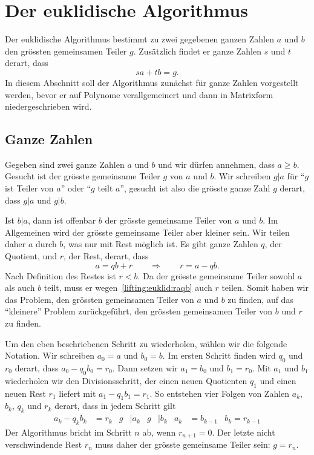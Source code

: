 %
%
%
\section{Der euklidische Algorithmus}
Der euklidische Algorithmus bestimmt zu zwei gegebenen ganzen
Zahlen $a$ und $b$ den grössten gemeinsamen Teiler $g$.
Zusätzlich findet er ganze Zahlen $s$ und $t$ derart, dass
\[
sa + tb = g.
\]
In diesem Abschnitt soll der Algorithmus zunächst für ganze Zahlen
vorgestellt werden, bevor er auf Polynome verallgemeinert und dann
in Matrixform niedergeschrieben wird.

\subsection{Ganze Zahlen}
Gegeben sind zwei ganze Zahlen $a$ und $b$ und wir dürfen annehmen,
dass $a\ge b$.
Gesucht ist der grösste gemeinsame Teiler $g$ von $a$ und $b$.
Wir schreiben $g|a$ für ``$g$ ist Teiler von $a$'' oder ``$g$ teilt $a$'',
gesucht ist also die grösste ganze Zahl $g$ derart, dass $g|a$ und $g|b$.

Ist $b|a$, dann ist offenbar $b$ der grösste gemeinsame Teiler von $a$
und $b$.
Im Allgemeinen wird der grösste gemeinsame Teiler aber kleiner sein.
Wir teilen daher $a$ durch $b$, was nur mit Rest möglich ist.
Es gibt ganze Zahlen $q$, der Quotient, und $r$, der Rest, derart, dass
\begin{equation}
a = qb+ r
\qquad \Rightarrow \qquad
r = a - qb.
\label{lifting:euklid:raqb}
\end{equation}
Nach Definition des Restes ist $r < b$.
Da der grösste gemeinsame Teiler sowohl $a$ als auch $b$ teilt, muss er
wegen~\eqref{lifting:euklid:raqb} auch $r$ teilen.
Somit haben wir das Problem, den grössten gemeinsamen Teiler von $a$ und
$b$ zu finden, auf das ``kleinere'' Problem zurückgeführt, den grössten
gemeinsamen Teiler von $b$ und $r$ zu finden.

Um den eben beschriebenen Schritt zu wiederholen, wählen wir die folgende
Notation.
Wir schreiben $a_0=a$ und $b_0=b$.
Im ersten Schritt finden wird $q_0$ und $r_0$ derart,
dass $a_0-q_0b_0 = r_0$.
Dann setzen wir $a_1=b_0$ und $b_1=r_0$.
Mit $a_1$ und $b_1$ wiederholen wir den Divisionsschritt, der einen
neuen Quotienten $q_1$ und einen neuen Rest $r_1$ liefert mit $a_1-q_1b_1=r_1$.
So entstehen vier Folgen von Zahlen $a_k$, $b_k$, $q_k$ und $r_k$ derart,
dass in jedem Schritt gilt
\begin{align*}
a_k - q_kb_k &= r_k & g&|a_k & g&|b_k & a_k &= b_{k-1} & b_k = r_{k-1}
\end{align*}
Der Algorithmus bricht im Schritt $n$ ab, wenn $r_{n+1}=0$.
Der letzte nicht verschwindende Rest $r_n$ muss daher der grösste gemeinsame
Teiler sein: $g=r_n$.

